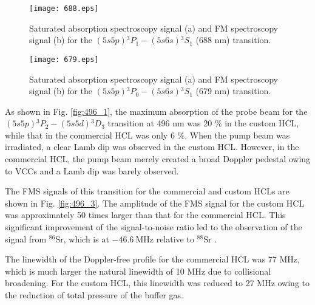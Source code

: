 \documentclass[twocolumn,10pt,a4paper]{article}
\begin{document}
\begin{figure}[t]
	\begin{center}
		\texttt{[image: 688.eps]}
		\caption{Saturated absorption spectroscopy signal (a) and FM spectroscopy signal (b) for the $(5s5p){}^3P_1-(5s6s){}^3S_1$ (688 nm) transition.}
		\label{fig:688}
	\end{center}
\end{figure}

\begin{figure}[t]
	\begin{center}
		\texttt{[image: 679.eps]}
		\caption{Saturated absorption spectroscopy signal (a) and FM spectroscopy signal (b) for the $(5s5p){}^3P_0-(5s6s){}^3S_1$ (679 nm) transition.}
		\label{fig:679}
	\end{center}
\end{figure}

As shown in Fig. \ref{fig:496_1}, the maximum absorption of the probe beam for the $(5s5p){}^3P_2-(5s5d){}^3D_3$ transition at 496 nm was 20 \% in the custom HCL, while that in the commercial HCL was only 6 \%. When the pump beam was irradiated, a clear Lamb dip was observed in the custom HCL. However, in the commercial HCL, the pump beam merely created a broad Doppler pedestal owing to VCCs \cite{vcc} and a Lamb dip was barely observed.

The FMS signals of this transition for the commercial and custom HCLs are shown in Fig. \ref{fig:496_3}. The amplitude of the FMS signal for the custom HCL was approximately 50 times larger than that for the commercial HCL. This significant improvement of the signal-to-noise ratio led to the observation of the signal from $^{86}\mathrm{Sr}$, which is at $-46.6\ \mathrm{MHz}$ relative to $^{88}\mathrm{Sr}$ \cite{energylevel3}.

The linewidth of the Doppler-free profile for the commercial HCL was 77 MHz, which is much larger the natural linewidth of 10 MHz due to collisional broadening. For the custom HCL, this linewidth was reduced to 27 MHz owing to the reduction of total pressure of the buffer gas.
\end{document}
